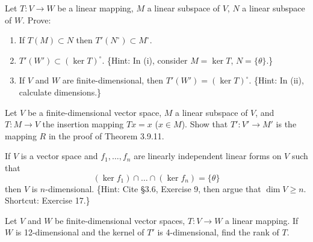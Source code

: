 \begin{tcolorbox}[title=Exercise 18, breakable]
    Let $T : V \to W$ be a linear mapping, $M$ a linear subspace of $V$, $N$ a 
    linear subspace of $W$. Prove:
    \begin{enumerate}
        \item[(i)] If $T(M) \subset N$ then $T'(N^\circ) \subset M^\circ$.
        \item[(ii)] $T'(W') \subset (\ker T)^\circ$. \{Hint: In (i), consider $M = \ker T$, $N = \{\theta\}$.\}
        \item[(iii)] If $V$ and $W$ are finite-dimensional, then $T'(W') = (\ker T)^\circ$. \{Hint: 
        In (ii), calculate dimensions.\}
    \end{enumerate}
\end{tcolorbox}

\begin{tcolorbox}[title=Exercise 19, breakable]
    Let $V$ be a finite-dimensional vector space, $M$ a linear subspace of $V$, 
    and $T : M \to V$ the insertion mapping $Tx = x$ ($x \in M$). Show that 
    $T' : V' \to M'$ is the mapping $R$ in the proof of Theorem 3.9.11.
\end{tcolorbox}

\begin{tcolorbox}[title=Exercise 20, breakable]
    If $V$ is a vector space and $f_1, \ldots, f_n$ are linearly independent linear 
    forms on $V$ such that 
    \[(\ker f_1) \cap \ldots \cap (\ker f_n) = \{\theta\}\]
    then $V$ is $n$-dimensional. \{Hint: Cite \S 3.6, Exercise 9, then argue that 
    $\dim V \ge n$. Shortcut: Exercise 17.\}
\end{tcolorbox}

\begin{tcolorbox}[title=Exercise 21, breakable]
    Let $V$ and $W$ be finite-dimensional vector spaces, $T : V \to W$ a linear 
    mapping. If $W$ is 12-dimensional and the kernel of $T'$ is 4-dimensional, 
    find the rank of $T$.
\end{tcolorbox}